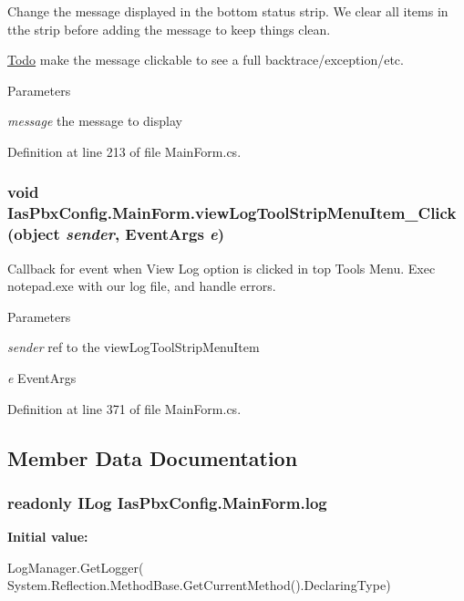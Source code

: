 Change the message displayed in the bottom status strip. We clear all items in tthe strip before adding the message to keep things clean. \begin{Desc}
\item[\hyperlink{todo__todo000039}{Todo}]make the message clickable to see a full backtrace/exception/etc. \end{Desc}

\begin{DoxyParams}{Parameters}
\item[{\em message}]the message to display \end{DoxyParams}


Definition at line 213 of file MainForm.cs.\hypertarget{class_ias_pbx_config_1_1_main_form_aa6699db5558f8792d3d88313a456d423}{
\subsubsection[{viewLogToolStripMenuItem\_\-Click}]{\setlength{\rightskip}{0pt plus 5cm}void IasPbxConfig.MainForm.viewLogToolStripMenuItem\_\-Click (object {\em sender}, \/  EventArgs {\em e})}}
\label{class_ias_pbx_config_1_1_main_form_aa6699db5558f8792d3d88313a456d423}


Callback for event when View Log option is clicked in top Tools Menu. Exec notepad.exe with our log file, and handle errors. 
\begin{DoxyParams}{Parameters}
\item[{\em sender}]ref to the viewLogToolStripMenuItem \item[{\em e}]EventArgs \end{DoxyParams}


Definition at line 371 of file MainForm.cs.

\subsection{Member Data Documentation}
\hypertarget{class_ias_pbx_config_1_1_main_form_a8851a476622496a7d2d08e1879eafa72}{
\subsubsection[{log}]{\setlength{\rightskip}{0pt plus 5cm}readonly ILog {\bf IasPbxConfig.MainForm.log}}}
\label{class_ias_pbx_config_1_1_main_form_a8851a476622496a7d2d08e1879eafa72}
{\bfseries Initial value:}
\begin{DoxyCode}
 LogManager.GetLogger(
            System.Reflection.MethodBase.GetCurrentMethod().DeclaringType)
\end{DoxyCode}


